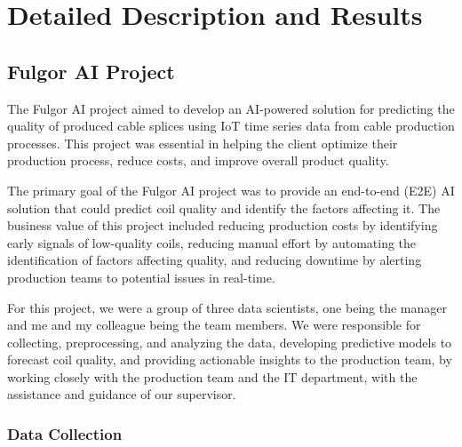 \chapter{Detailed Description and Results}
\label{sec:results-int}

\section{Fulgor AI Project}

The Fulgor AI project aimed to develop an AI-powered solution for predicting
the quality of produced cable splices using IoT time series data from cable
production processes. This project was essential in helping the client optimize
their production process, reduce costs, and improve overall product quality.

The primary goal of the Fulgor AI project was to provide an end-to-end (E2E) AI
solution that could predict coil quality and identify the factors affecting it.
The business value of this project included reducing production costs by
identifying early signals of low-quality coils, reducing manual effort by
automating the identification of factors affecting quality, and reducing
downtime by alerting production teams to potential issues in real-time.

For this project, we were a group of three data scientists, one being the
manager and me and my colleague being the team members. We were responsible for
collecting, preprocessing, and analyzing the data, developing predictive models
to forecast coil quality, and providing actionable insights to the production
team, by working closely with the production team and the IT department, with
the assistance and guidance of our supervisor.

\subsection{Data Collection}

